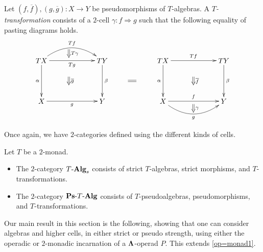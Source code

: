 \begin{Defi}
Let $(f, \overline{f}), (g, \overline{g}) \colon X \rightarrow Y$ be pseudomorphisms of $T$-algebras. A \textit{$T$-transformation} consists of a $2$-cell $\gamma \colon f \Rightarrow g$ such that the following equality of pasting diagrams holds.
    \[
        \xy
            (0,0)*+{TX}="00";
            (30,0)*+{TY}="10";
            (0,-20)*+{X}="01";
            (30,-20)*+{Y}="11";
            {\ar@/^1.5pc/^{Tf} "00" ; "10"};
            {\ar_{Tg} "00" ; "10"};
            {\ar^{\beta} "10" ; "11"};
            {\ar_{\alpha} "00" ; "01"};
            {\ar_{g} "01" ; "11"};
            {\ar@{=>}^{T \gamma} (13.5,5.5) ; (13.5,1.5)};
            {\ar@{=>}^{\overline{g}} (13.5,-8) ; (13.5,-12)};
            (60,0)*+{TX}="x00";
            (90,0)*+{TY}="x10";
            (60,-20)*+{X}="x01";
            (90,-20)*+{Y}="x11";
            {\ar^{Tf} "x00" ; "x10"};
            {\ar^{\beta} "x10" ; "x11"};
            {\ar_{\alpha} "x00" ; "x01"};
            {\ar^{f} "x01" ; "x11"};
            {\ar@/_1.5pc/_{g} "x01" ; "x11"};
            {\ar@{=>}^{\gamma} (75,-21.5) ; (75,-25.5)};
            {\ar@{=>}^{\overline{f}} (75,-8) ; (75,-12)};
            {\ar@{=} (42.75,-10) ; (46.75,-10)};
        \endxy
    \]

\end{Defi}

Once again, we have $2$-categories defined using the different kinds of cells.

\begin{Defi}
Let $T$ be a $2$-monad.
\begin{itemize}
\item The $2$-category $T\mbox{-}\mathbf{Alg}_{s}$ consists of strict $T$-algebras, strict morphisms, and $T$-transformations.
\item The $2$-category $\mathbf{Ps}\mbox{-}T\mbox{-}\mathbf{Alg}$ consists of $T$-pseudoalgebras, pseudomorphisms, and $T$-transformations.
\end{itemize}
\end{Defi}

Our main result in this section is the following, showing that one can consider algebras and higher cells, in either strict or pseudo strength, using either the operadic or $2$-monadic incarnation of a $\mathbf{\Lambda}$-operad $P$. This extends \cref{op=monad1}.

